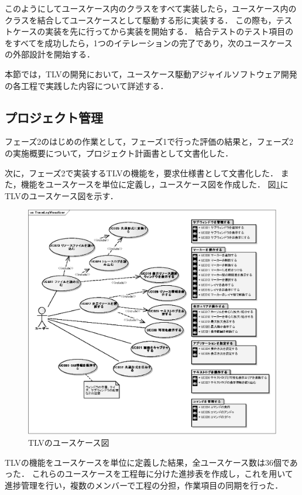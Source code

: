 このようにしてユースケース内のクラスをすべて実装したら，ユースケース内のクラスを結合してユースケースとして駆動する形に実装する．
この際も，テストケースの実装を先に行ってから実装を開始する．
結合テストのテスト項目のをすべてを成功したら，1つのイテレーションの完了であり，次のユースケースの外部設計を開始する．

本節では，TLVの開発において，ユースケース駆動アジャイルソフトウェア開発の各工程で実践した内容について詳述する．

\subsection{プロジェクト管理}

フェーズ2のはじめの作業として，フェーズ1で行った評価の結果と，フェーズ2の実施概要について，プロジェクト計画書として文書化した．

次に，フェーズ2で実装するTLVの機能を，要求仕様書として文書化した．
また，機能をユースケースを単位に定義し，ユースケース図を作成した．
図\ref{fig:usecase}にTLVのユースケース図を示す．

\begin{figure}[t]
\begin{center}
\includegraphics[scale=0.75]{img/usecase.eps}
\caption{TLVのユースケース図}
\label{fig:usecase}
\end{center}
\end{figure}

TLVの機能をユースケースを単位に定義した結果，全ユースケース数は36個であった．
これらのユースケースを工程毎に分けた進捗表を作成し，これを用いて進捗管理を行い，複数のメンバーで工程の分担，作業項目の同期を行った．


